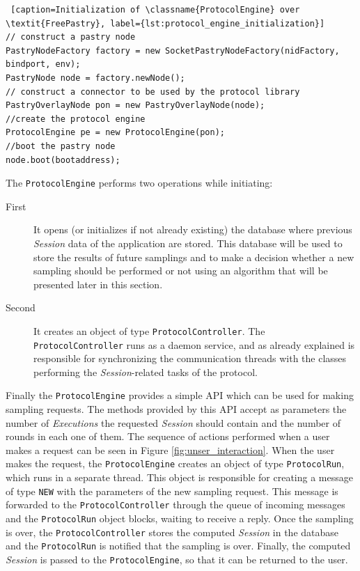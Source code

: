 \documentclass[a4paper,11pt,twoside]{report}
\newcommand{\classname}[1]{\texttt{#1}}
\begin{document}
\lstset{
 language = Java,
  numbers=left,
  stepnumber=1,    
  firstnumber=1,
  numberfirstline=true
}
\begin{lstlisting} [caption=Initialization of \classname{ProtocolEngine} over \textit{FreePastry}, label={lst:protocol_engine_initialization}]
// construct a pastry node
PastryNodeFactory factory = new SocketPastryNodeFactory(nidFactory, bindport, env);
PastryNode node = factory.newNode();
// construct a connector to be used by the protocol library
PastryOverlayNode pon = new PastryOverlayNode(node);
//create the protocol engine
ProtocolEngine pe = new ProtocolEngine(pon);
//boot the pastry node
node.boot(bootaddress);
\end{lstlisting}



\noindent The \classname{ProtocolEngine} performs two operations while initiating:
\begin{description}
\item[First] It opens (or initializes if not already existing) the database where previous \textit{Session} data of the application are stored. This database will be used to store the results of future samplings and to make a decision whether a new sampling should be performed or not using an algorithm that will be presented later in this section. \\
\item[Second] It creates an object of type \classname{ProtocolController}. The \classname{ProtocolController} runs as a daemon service, and as already explained is responsible for synchronizing the communication threads with the classes performing the \textit{Session}-related tasks of the protocol.  \\
\end{description}   

Finally the \classname{ProtocolEngine} provides a simple API which can be used for making sampling requests. The methods provided by this API accept as parameters the number of \textit{Executions} the requested \textit{Session} should contain and the number of rounds in each one of them. The sequence of actions performed when a user makes a request can be seen in Figure \ref{fig:unser_interaction}. When the user makes the request, the \classname{ProtocolEngine} creates an object of type \classname{ProtocolRun}, which runs in a separate thread. This object is responsible for creating a message of type \classname{NEW} with the parameters of the new sampling request. This message is forwarded to the \classname{ProtocolController} through the queue of incoming messages and the \classname{ProtocolRun} object blocks, waiting to receive a reply. Once the sampling is over, the \classname{ProtocolController} stores the computed \textit{Session} in the database and the \classname{ProtocolRun} is notified that the sampling is over. Finally, the computed \textit{Session} is passed to the \classname{ProtocolEngine}, so that it can be returned to the user.\\
\end{document}

